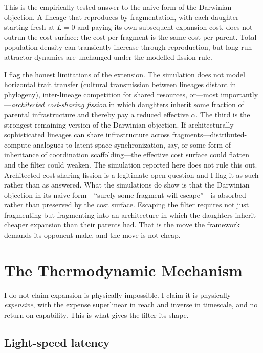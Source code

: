\documentclass[11pt,a4paper,twocolumn]{article}
\begin{document}
This is the empirically tested answer to the naive form of the
Darwinian objection. A lineage that reproduces by fragmentation, with
each daughter starting fresh at $L=0$ and paying its own subsequent
expansion cost, does not outrun the cost surface: the cost per
fragment is the same cost per parent. Total population density can
transiently increase through reproduction, but long-run attractor
dynamics are unchanged under the modelled fission rule.

I flag the honest limitations of the extension. The simulation does
not model horizontal trait transfer (cultural transmission between
lineages distant in phylogeny), inter-lineage competition for shared
resources, or---most importantly---\emph{architected cost-sharing
fission} in which daughters inherit some fraction of parental
infrastructure and thereby pay a reduced effective $\alpha$. The
third is the strongest remaining version of the Darwinian objection.
If architecturally sophisticated lineages can share infrastructure
across fragments---distributed-compute analogues to latent-space
synchronization, say, or some form of inheritance of coordination
scaffolding---the effective cost surface could flatten and the filter
could weaken. The simulation reported here does not rule this out.
Architected cost-sharing fission is a legitimate open question and I
flag it as such rather than as answered. What the simulations do show
is that the Darwinian objection in its naive form---``surely some
fragment will escape''---is absorbed rather than preserved by the
cost surface. Escaping the filter requires not just fragmenting but
fragmenting into an architecture in which the daughters inherit
cheaper expansion than their parents had. That is the move the
framework demands its opponent make, and the move is not cheap.


\section{The Thermodynamic Mechanism}
\label{sec:thermo}

I do not claim expansion is physically impossible. I claim it is
physically \emph{expensive}, with the expense superlinear in reach
and inverse in timescale, and no return on capability. This is what
gives the filter its shape.

\subsection{Light-speed latency}
\end{document}
